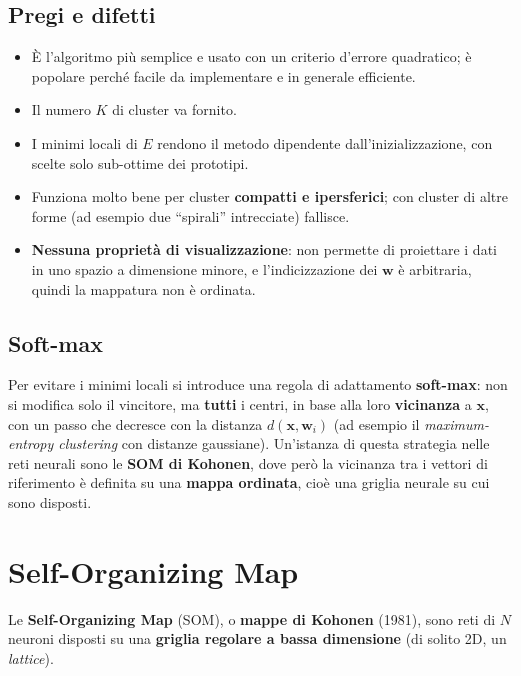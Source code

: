 \subsection{Pregi e difetti}\label{pregi-e-difetti}

\begin{itemize}
\tightlist
\item
  È l'algoritmo più semplice e usato con un criterio d'errore
  quadratico; è popolare perché facile da implementare e in generale
  efficiente.
\item
  Il numero \(K\) di cluster va fornito.
\item
  I minimi locali di \(E\) rendono il metodo dipendente
  dall'inizializzazione, con scelte solo sub-ottime dei prototipi.
\item
  Funziona molto bene per cluster \textbf{compatti e ipersferici}; con
  cluster di altre forme (ad esempio due ``spirali'' intrecciate)
  fallisce.
\item
  \textbf{Nessuna proprietà di visualizzazione}: non permette di
  proiettare i dati in uno spazio a dimensione minore, e
  l'indicizzazione dei \(\mathbf{w}\) è arbitraria, quindi la mappatura
  non è ordinata.
\end{itemize}

\subsection{Soft-max}\label{soft-max}

Per evitare i minimi locali si introduce una regola di adattamento
\textbf{soft-max}: non si modifica solo il vincitore, ma \textbf{tutti}
i centri, in base alla loro \textbf{vicinanza} a \(\mathbf{x}\), con un
passo che decresce con la distanza \(d(\mathbf{x}, \mathbf{w}_i)\) (ad
esempio il \emph{maximum-entropy clustering} con distanze gaussiane).
Un'istanza di questa strategia nelle reti neurali sono le \textbf{SOM di
Kohonen}, dove però la vicinanza tra i vettori di riferimento è definita
su una \textbf{mappa ordinata}, cioè una griglia neurale su cui sono
disposti.

\section{Self-Organizing Map}\label{self-organizing-map}

Le \textbf{Self-Organizing Map} (SOM), o \textbf{mappe di Kohonen}
(1981), sono reti di \(N\) neuroni disposti su una \textbf{griglia
regolare a bassa dimensione} (di solito 2D, un \emph{lattice}).

